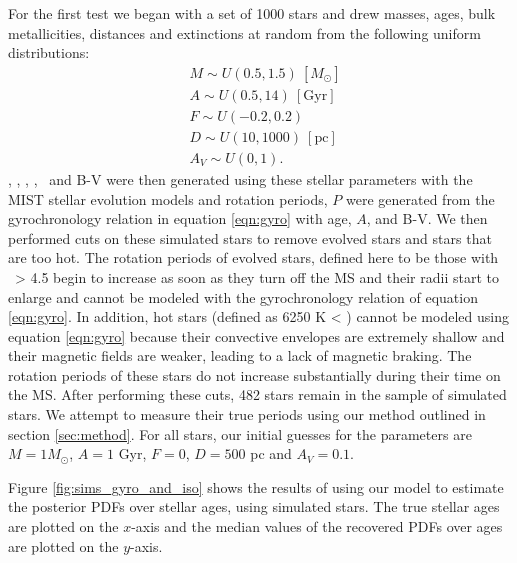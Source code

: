 For the first test we began with a set of 1000 stars and drew masses, ages,
bulk metallicities, distances and extinctions at random from the following
uniform distributions:
\begin{eqnarray}
& M \sim U(0.5, 1.5)~[M_\odot] \\
& A \sim U(0.5, 14)\mathrm{~[Gyr]} \\
& F \sim U(-0.2, 0.2) \\
& D \sim U(10, 1000)~\mathrm{[pc]} \\
& A_V \sim U(0, 1).
\end{eqnarray}
\teff, \logg, \fhat, {\bf \mx}, \pmega\ and B-V were then generated using
these stellar parameters with the MIST stellar evolution models \citep{choi}
and rotation periods, $P$ were generated from the gyrochronology relation in
equation \ref{eqn:gyro} with age, $A$, and B-V.
We then performed cuts on these simulated stars to remove evolved stars and
stars that are too hot.
The rotation periods of evolved stars, defined here to be those with \logg\ >
4.5 begin to increase as soon as they turn off the MS and their radii start to
enlarge and cannot be modeled with the gyrochronology relation of equation
\ref{eqn:gyro}.
In addition, hot stars (defined as 6250 K < \teff) cannot be modeled using
equation \ref{eqn:gyro} because their convective envelopes are extremely
shallow and their magnetic fields are weaker, leading to a lack of magnetic
braking.
The rotation periods of these stars do not increase substantially during their
time on the MS.
After performing these cuts, 482  stars remain in the sample
of simulated stars.
We attempt to measure their true periods using our method outlined in section
\ref{sec:method}.
For all stars, our initial guesses for the parameters are $M = 1M_\odot$, $A =
1$ Gyr, $F = 0$, $D = 500$ pc and $A_V = 0.1$.

Figure \ref{fig:sims_gyro_and_iso} shows the results of using our model to
estimate the posterior PDFs over stellar ages, using simulated stars.
The true stellar ages are plotted on the $x$-axis and the median values of the
recovered PDFs over ages are plotted on the $y$-axis.


